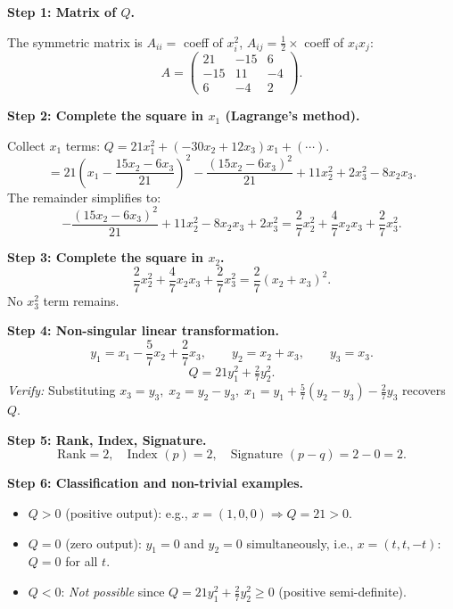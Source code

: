 \documentclass[12pt,a3paper]{article}
\begin{document}
\begin{tcolorbox}[enhanced,breakable,
  colback=cE!4,colframe=cE,boxrule=0.8pt,arc=5pt,
  title={\textbf{Answer --- Quadratic Form to Canonical Form}},
  fonttitle=\bfseries\color{white},colbacktitle=cE]

\textbf{Step 1: Matrix of $Q$.}

The symmetric matrix is $A_{ii}=$ coeff of $x_i^2$, $A_{ij}=\tfrac{1}{2}\times$ coeff of $x_ix_j$:
\[
A=\begin{pmatrix}21&-15&6\\-15&11&-4\\6&-4&2\end{pmatrix}.
\]

\textbf{Step 2: Complete the square in $x_1$ (Lagrange's method).}

Collect $x_1$ terms: $Q=21x_1^2+(-30x_2+12x_3)x_1+(\cdots)$.
\[
=21\!\left(x_1-\frac{15x_2-6x_3}{21}\right)^{\!2}-\frac{(15x_2-6x_3)^2}{21}+11x_2^2+2x_3^2-8x_2x_3.
\]
The remainder simplifies to:
\[
-\frac{(15x_2-6x_3)^2}{21}+11x_2^2-8x_2x_3+2x_3^2 = \frac{2}{7}x_2^2+\frac{4}{7}x_2x_3+\frac{2}{7}x_3^2.
\]

\textbf{Step 3: Complete the square in $x_2$.}
\[
\frac{2}{7}x_2^2+\frac{4}{7}x_2x_3+\frac{2}{7}x_3^2=\frac{2}{7}(x_2+x_3)^2.
\]
No $x_3^2$ term remains.

\textbf{Step 4: Non-singular linear transformation.}
\[
y_1=x_1-\frac{5}{7}x_2+\frac{2}{7}x_3,\qquad y_2=x_2+x_3,\qquad y_3=x_3.
\]
\[
\boxed{Q=21y_1^2+\tfrac{2}{7}y_2^2.}
\]
\textit{Verify:} Substituting $x_3=y_3,\;x_2=y_2-y_3,\;x_1=y_1+\tfrac{5}{7}(y_2-y_3)-\tfrac{2}{7}y_3$ recovers $Q$.\;\checkmark

\medskip
\textbf{Step 5: Rank, Index, Signature.}
\[
\text{Rank}=2,\quad\text{Index }(p)=2,\quad\text{Signature }(p-q)=2-0=2.
\]

\textbf{Step 6: Classification and non-trivial examples.}
\begin{itemize}
  \item $Q>0$ (positive output): e.g., $x=(1,0,0)\Rightarrow Q=21>0$.
  \item $Q=0$ (zero output): $y_1=0$ and $y_2=0$ simultaneously, i.e., $x=(t,t,-t)$: $Q=0$ for all $t$.
  \item $Q<0$: \emph{Not possible} since $Q=21y_1^2+\tfrac{2}{7}y_2^2\geq0$ (positive semi-definite).
\end{itemize}

\end{tcolorbox}
\end{document}
